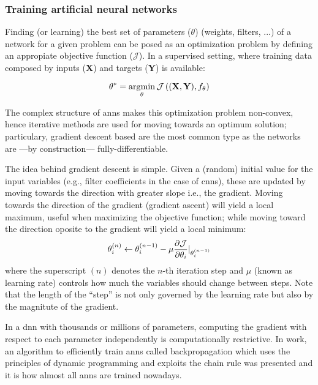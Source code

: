 \documentclass[../main.tex]{subfiles}
\begin{document}
\subsubsection{Training artificial neural networks}\label{sec:optimizers}
Finding (or learning) the best set of parameters ($\theta$) (weights, filters,
...) of a network for a given problem can be posed as an optimization problem by
defining an appropiate objective function ($\mathcal{J}$).
In a supervised setting, where training data composed by
inputs (\textbf{X}) and targets (\textbf{Y}) is available:

\begin{equation}
\theta^* = \operatorname*{arg\!\min}_{\theta} \mathcal{J}
\left( (\mathbf{X}, \mathbf{Y}), f_{\theta} \right)
\end{equation}

The complex structure of \glspl{ann} makes this optimization problem non-convex,
hence iterative methods are used for moving towards an optimum solution;
particulary, gradient descent based are the most common type as the networks
are ---by construction--- fully-differentiable.

The idea behind gradient descent is simple. Given a (random) initial value
for the input variables (e.g., filter coefficients in the case of \glspl{cnn}),
these are updated by moving towards the direction with greater slope
i.e., the gradient. Moving towards the direction of the gradient (gradient
ascent) will yield a local maximum, useful when maximizing the objective
function; while moving toward the direction oposite to the gradient will
yield a local minimum:
\begin{equation}\label{eq:gradient-descent}
\theta_i^{(n)} \leftarrow \theta_i^{(n - 1)}
- \mu \frac{\partial \mathcal{J}}{\partial \theta_i}
\rvert_{\theta_i^{(n - 1)}}
\end{equation}
where the superscript $(n)$ denotes the $n$-th iteration step and $\mu$
(known as learning rate) controls how much the variables should change between
steps. Note that the length of the ``step'' is not only governed by the
learning rate but also by the magnitute of the gradient.

In a \gls{dnn} with thousands or millions of parameters, computing the gradient
with respect to each parameter independently is computationally restrictive.
In \cite{backprop} work, an algorithm to efficiently train \glspl{ann}
called backpropagation\footnotemark{}  which uses the principles of dynamic
programming and exploits the chain rule was presented and it is how almost
all \glspl{ann} are trained nowadays.
\end{document}

